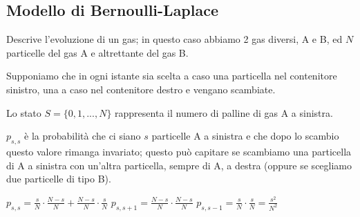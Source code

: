 \documentclass[a4paper,12pt]{book}
\begin{document}
\subsection{Modello di Bernoulli-Laplace}

Descrive l'evoluzione di un gas; in questo caso abbiamo 2 gas diversi, A e B, ed $ N $ particelle del gas A e altrettante del gas B.

\begin{center}
\end{center}

Supponiamo che in ogni istante sia scelta a caso una particella nel contenitore sinistro, una a caso nel contenitore destro e vengano scambiate. 

Lo stato $ S = \{0, 1, ..., N\} $ rappresenta il numero di palline di gas A a sinistra. 

$ p_{s,s} $ è la probabilità che ci siano $ s $ particelle A a sinistra e che dopo lo scambio questo valore rimanga invariato; questo può capitare se scambiamo una particella di A a sinistra con un'altra particella, sempre di A, a destra (oppure se scegliamo due particelle di tipo B).

$ p_{s,s} = \frac{s}{N} \cdot \frac{N-s}{N} + \frac{N-s}{N} \cdot \frac{s}{N} $
$ p_{s,s+1} = \frac{N-s}{N} \cdot \frac{N-s}{N} $
$ p_{s,s-1} = \frac{s}{N}\cdot \frac{s}{N} = \frac{s^2}{N^2} $
\end{document}
